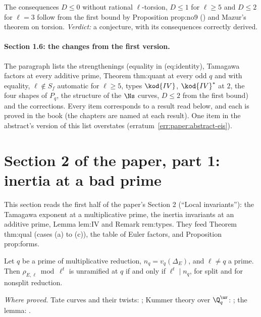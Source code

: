 \begin{sloppypar}
\noindent The consequences $D\le0$ without rational $\ell$-torsion, $D\le1$ for $\ell\ge5$ and $D\le2$ for $\ell=3$ follow from the first bound by Proposition prop:no9
() and Mazur's theorem on torsion. \emph{Verdict:} a conjecture, with its consequences correctly derived.

\paragraph{Section 1.6: the changes from the first version.} The paragraph lists the strengthenings (equality in (eq:identity), Tamagawa factors at every
additive prime, Theorem thm:quant at every odd $q$ and with equality, $\ell\notin S_f$ automatic for $\ell\ge5$, types $\kod{IV}$, $\kod{IV}^*$ at $2$, the four shapes of $P_q$,
the structure of the $\Ns$ curves, $D\le2$ from the first bound) and the corrections. Every item corresponds to a result read below, and each is
proved in the book (the chapters are named at each result). One item in the abstract's version of this list overstates (erratum~\ref{err:paper:abstract-eis}).

\section[Paper 2: inertia]{Section 2 of the paper, part 1: inertia at a bad prime}\label{sec:paper:inertia}

This section reads the first half of the paper's Section 2 (``Local invariants''): the Tamagawa exponent at a multiplicative prime, the inertia
invariants at an additive prime, Lemma lem:IV and Remark rem:types. They feed Theorem thm:qual (cases (a) to (c)), the table of Euler factors, and
Proposition prop:forms.

\begin{lemma}\label{lem:paper:tamagawa-exp}
Let $q$ be a prime of multiplicative reduction, $n_q=v_q(\Delta_E)$, and $\ell\ne q$ a prime. Then $\rho_{E,\ell}\bmod\ell^t$ is unramified at $q$ if and only if $\ell^t\mid n_q$, for
split and for nonsplit reduction.
\end{lemma}

\noindent\emph{Where proved.} Tate curves and their twists: ; Kummer theory over $\Q_q^{\ur}$: ; the lemma: .


\end{sloppypar}
